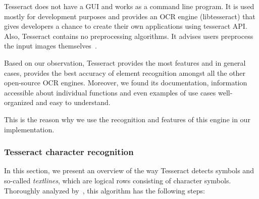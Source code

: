 Tesseract does not have a GUI and works as a command line program. It is used mostly for development purposes and provides an OCR engine (libtesseract) that gives developers a chance to create their own applications using tesseract API. Also, Tesseract contains no preprocessing algorithms. It advises users preprocess the input images themselves~\citep{TesseractQual}.

Based on our observation, Tesseract provides the most features and in general cases, provides the best accuracy of element recognition amongst all the other open-source OCR engines. Moreover, we found its documentation, information accessible about individual functions and even examples of use cases well-organized and easy to understand.

This is the reason why we use the recognition and features of this engine in our implementation.

\subsubsection{Tesseract character recognition} \label{tesseractCharacterRecognition}

In this section, we present an overview of the way Tesseract detects symbols and so-called \emph{textlines}, which are logical rows consisting of character symbols. Thoroughly analyzed by~\citet{smith2007overview}, this algorithm has the following steps:

